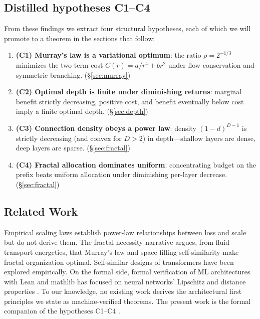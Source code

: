 \documentclass[conference]{IEEEtran}
\begin{document}
\subsection{Distilled hypotheses C1--C4}
\label{sec:hypotheses}
From these findings we extract four structural hypotheses, each of which we
will promote to a theorem in the sections that follow:
\begin{enumerate}
\item \textbf{(C1) Murray's law is a variational optimum}: the ratio
$\rho=2^{-1/3}$ minimizes the two-term cost $C(r)=a/r^4+br^2$ under flow
conservation and symmetric branching. \textnormal{(\S\ref{sec:murray})}
\item \textbf{(C2) Optimal depth is finite under diminishing returns}: marginal
benefit strictly decreasing, positive cost, and benefit eventually below cost
imply a finite optimal depth. \textnormal{(\S\ref{sec:depth})}
\item \textbf{(C3) Connection density obeys a power law}: density
$(1-d)^{D-1}$ is strictly decreasing (and convex for $D>2$) in depth---shallow
layers are dense, deep layers are sparse. \textnormal{(\S\ref{sec:fractal})}
\item \textbf{(C4) Fractal allocation dominates uniform}: concentrating budget
on the prefix beats uniform allocation under diminishing per-layer decrease.
\textnormal{(\S\ref{sec:fractal})}
\end{enumerate}

\subsection{Related Work}
Empirical scaling laws \cite{kaplan2020scaling,brown2020language,hoffmann2022train} establish power-law
relationships between loss and scale but do not derive them. The fractal
necessity narrative \cite{shape2026} argues, from fluid-transport energetics,
that Murray's law \cite{murray1926} and space-filling self-similarity make
fractal organization optimal. Self-similar designs of transformers
\cite{deepnested,jawahar} have been explored empirically. On the formal side,
formal verification of ML architectures with Lean and mathlib
\cite{mathlib,avigad2020} has focused on neural networks' Lipschitz and
distance properties \cite{bentinnes2017}. To our knowledge, no existing work
derives the architectural first principles we state as machine-verified
theorems. The present work is the formal companion of the hypotheses C1--C4
\cite{fractalnecessity}.
\end{document}
